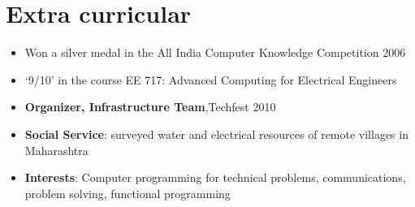 \documentclass[11pt]{article}
\begin{document}
\section*{Extra curricular}
\begin{itemize}
\item Won a silver medal in the All India Computer Knowledge Competition 2006 
\item `9/10' in the course EE 717: Advanced Computing for Electrical Engineers 
\item \textbf{Organizer, Infrastructure Team},Techfest 2010 
\item \textbf{Social Service}: surveyed water and electrical resources of remote villages in Maharashtra 
\item \textbf{Interests}:  Computer programming for technical problems, communications, problem solving, functional programming 
\end{itemize}
\end{document}
